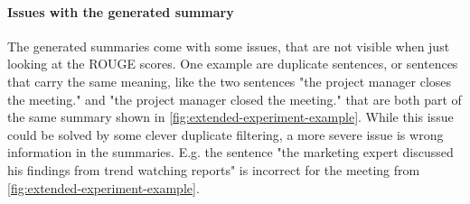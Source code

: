 \paragraph{Issues with the generated summary}

The generated summaries come with some issues, that are not visible when just looking at the ROUGE scores.
One example are duplicate sentences, or sentences that carry the same meaning, like the two sentences "the project manager closes the meeting." and "the project manager closed the meeting." that are both part of the same summary shown in \cref{fig:extended-experiment-example}.
While this issue could be solved by some clever duplicate filtering, a more severe issue is wrong information in the summaries.
E.g. the sentence "the marketing expert discussed his findings from trend watching reports" is incorrect for the meeting from \cref{fig:extended-experiment-example}.